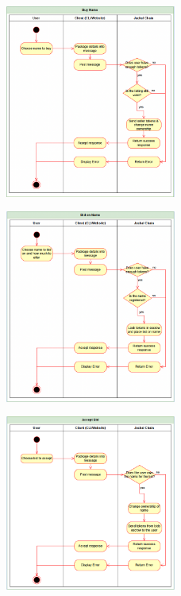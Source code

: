 \documentclass[a4paper]{article}
\begin{document}
\begin{figure}[!htbp]
\centering
\includegraphics[width=0.5\textwidth]{assets/rns4.png}
\end{figure}

\begin{figure}[!htbp]
\centering
\includegraphics[width=0.5\textwidth]{assets/rns5.png}
\end{figure}

\begin{figure}[!htbp]
\centering
\includegraphics[width=0.5\textwidth]{assets/rns6.png}
\end{figure}
\end{document}
